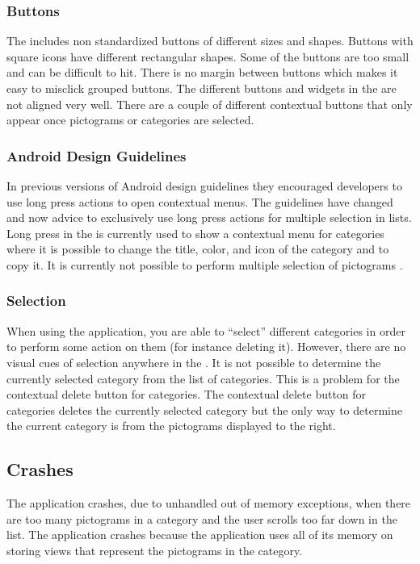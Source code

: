 \subsubsection{Buttons}

The \ct includes non standardized buttons of different sizes and shapes. Buttons with square icons have different rectangular shapes. Some of the buttons are too small and can be difficult to hit. There is no margin between buttons which makes it easy to misclick grouped buttons. The different buttons and widgets in the \ct are not aligned very well. There are a couple of different contextual buttons that only appear once pictograms or categories are selected. 

\subsubsection{Android Design Guidelines}

In previous versions of Android design guidelines they encouraged developers to use long press actions to open contextual menus. The guidelines have changed and now advice to exclusively use long press actions for multiple selection in lists. Long press in the \ct is currently used to show a contextual menu for categories where it is possible to change the title, color, and icon of the category and to copy it. It is currently not possible to perform multiple selection of pictograms \parencite{android_guidelines_longpress}.

\subsubsection{Selection}

When using the application, you are able to ``select'' different categories in order to perform some action on them (for instance deleting it). However, there are no visual cues of selection anywhere in the \ct.  It is not possible to determine the currently selected category from the list of categories. This is a problem for the contextual delete button for categories. The contextual delete button for categories deletes the currently selected category but the only way to determine the current category is from the pictograms displayed to the right.

\subsection{Crashes}
The application crashes, due to unhandled out of memory exceptions, when there are too many pictograms in a category and the user scrolls too far down in the list. The application crashes because the application uses all of its memory on storing views that represent the pictograms in the category. 

